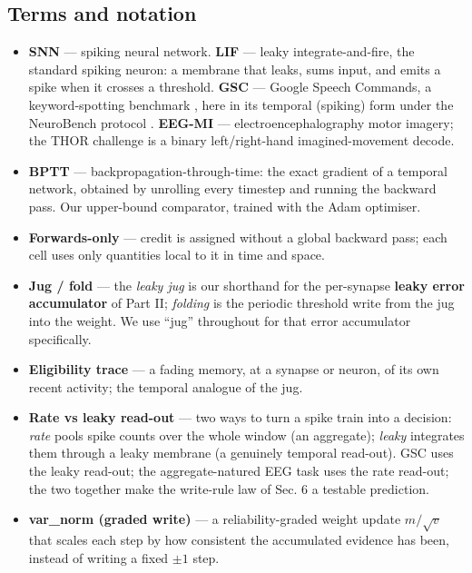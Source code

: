 \documentclass[11pt]{article}
\providecommand{\tightlist}{\setlength{\itemsep}{0pt}\setlength{\parskip}{0pt}}
\begin{document}
\hypertarget{terms-and-notation}{%
\subsection{Terms and notation}\label{terms-and-notation}}

\begin{itemize}
\tightlist
\item
  \textbf{SNN} --- spiking neural network. \textbf{LIF} --- leaky
  integrate-and-fire, the standard spiking neuron: a membrane that
  leaks, sums input, and emits a spike when it crosses a threshold.
  \textbf{GSC} --- Google Speech Commands, a keyword-spotting benchmark
  \cite{warden2018speech}, here in its temporal (spiking) form under
  the NeuroBench protocol \cite{yik2024neurobench}. \textbf{EEG-MI} ---
  electroencephalography motor imagery; the THOR challenge is a binary
  left/right-hand imagined-movement decode.
\item
  \textbf{BPTT} --- backpropagation-through-time: the exact gradient of
  a temporal network, obtained by unrolling every timestep and running
  the backward pass. Our upper-bound comparator, trained with the Adam
  optimiser.
\item
  \textbf{Forwards-only} --- credit is assigned without a global
  backward pass; each cell uses only quantities local to it in time and
  space.
\item
  \textbf{Jug / fold} --- the \emph{leaky jug} is our shorthand for the
  per-synapse \textbf{leaky error accumulator} of Part II;
  \emph{folding} is the periodic threshold write from the jug into the
  weight. We use ``jug'' throughout for that error accumulator
  specifically.
\item
  \textbf{Eligibility trace} --- a fading memory, at a synapse or
  neuron, of its own recent activity; the temporal analogue of the jug.
\item
  \textbf{Rate vs leaky read-out} --- two ways to turn a spike train
  into a decision: \emph{rate} pools spike counts over the whole window
  (an aggregate); \emph{leaky} integrates them through a leaky membrane
  (a genuinely temporal read-out). GSC uses the leaky read-out; the
  aggregate-natured EEG task uses the rate read-out; the two together
  make the write-rule law of Sec. 6 a testable prediction.
\item
  \textbf{var\_norm (graded write)} --- a reliability-graded weight
  update \(m/\sqrt{v}\) that scales each step by how consistent the
  accumulated evidence has been, instead of writing a fixed \(\pm1\)
  step.
\end{itemize}
\end{document}
